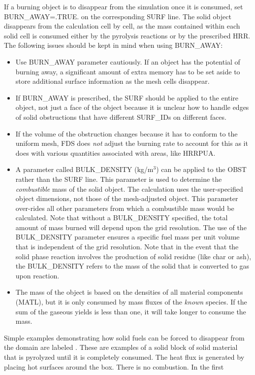 \documentclass[11pt]{book}
\begin{document}
If a burning object is to disappear from the simulation once it is consumed, set {\ct BURN\_AWAY=.TRUE.} on the corresponding {\ct SURF} line. The solid object disappears from the calculation cell by cell, as the mass contained within each solid cell is consumed either by the pyrolysis reactions or by the prescribed HRR. The following issues should be kept in mind when using {\ct BURN\_AWAY}:
\begin{itemize}
\item Use {\ct BURN\_AWAY} parameter cautiously. If an object has the potential of burning away, a significant amount of extra memory has to be set aside to store additional surface information as the mesh cells disappear.
\item If {\ct BURN\_AWAY} is prescribed, the {\ct SURF} should be applied to the entire object, not just a face of the object because it is unclear how to handle edges of solid obstructions that have different {\ct SURF\_ID}s on different faces.
\item If the volume of the obstruction changes because it has to conform to the uniform mesh, FDS does {\em not} adjust the burning rate to account for this as it does with various quantities associated with areas, like {\ct HRRPUA}.
\item A parameter called {\ct BULK\_DENSITY} (kg/m$^3$) can be applied to the {\ct OBST} rather than the {\ct SURF} line. This parameter is used to determine the {\em combustible} mass of the solid object. The calculation uses the user-specified object dimensions, not those of the mesh-adjusted object. This parameter over-rides all other parameters from which a combustible mass would be calculated. Note that without a {\ct BULK\_DENSITY} specified, the total amount of mass burned will depend upon the grid resolution. The use of the {\ct BULK\_DENSITY} parameter ensures a specific fuel mass per unit volume that is independent of the grid resolution. Note that in the event that the solid phase reaction involves the production of solid residue (like char or ash), the {\ct BULK\_DENSITY} refers to the mass of the solid that is converted to gas upon reaction.
\item The mass of the object is based on the densities of all material components ({\ct MATL}), but it is only consumed by mass fluxes of the {\em known} species. If the sum of the gaseous yields is less than one, it will take longer to consume the mass.
\end{itemize}
Simple examples demonstrating how solid fuels can be forced to disappear from the domain are labeled . These are examples of a solid block of solid material that is pyrolyzed until it is completely consumed. The heat flux is generated by placing hot surfaces around the box. There is no combustion. In the first
\end{document}
